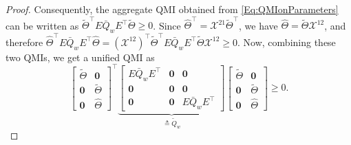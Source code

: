 \documentclass[letterpaper, 10 pt, conference]{ieeeconf}%
\newcommand{\N}{\mathbb{N}}
\newcommand{\T}{\top}
\newcommand{\I}{\mathbf{I}}
\newcommand{\0}{\mathbf{0}}
\newcommand{\X}{\mathcal{X}}
\newcommand{\diag}{\text{diag}}
\newcommand{\bm}[1]{\begin{bmatrix}#1\end{bmatrix}}
\begin{document}
\begin{proof}

Consequently, the aggregate QMI obtained from \eqref{Eq:QMIonParameters} can be written as $\tilde{\Theta}^\T E\bar Q_wE^\T\tilde{\Theta}\geq0$. Since 
$\hat{\Theta}^\T=\X^{21}\tilde{\Theta}^\T$, we have $\hat{\Theta}=\tilde{\Theta}\X^{12}$, and therefore
$
\hat{\Theta}^\T E\bar Q_wE^\T\hat{\Theta}
=
(\X^{12})^\T\tilde{\Theta}^\T E\bar Q_wE^\T\tilde{\Theta}\X^{12}\geq0.
$
Now, combining these two QMIs, we get a unified QMI as 
\begin{equation}\label{Eq:Pr:DataDrivenGlobalControllerDesignStep2}    
\bm{\tilde{\Theta} & \0 \\ \0 & \tilde{\Theta} \\ \0 & \hat{\Theta}}^\T 
\underbrace{\bm{E \bar{Q}_{w} E^\T & \0 & \0 \\ \0 & \0 & \0 \\ \0 & \0 & E\bar{Q}_{w} E^\T}}_{\triangleq \tilde{Q}_{w}}
\bm{\tilde{\Theta} & \0 \\ \0 & \tilde{\Theta} \\ \0 & \hat{\Theta}}
\geq 0.
\end{equation}


\end{proof}
\end{document}
